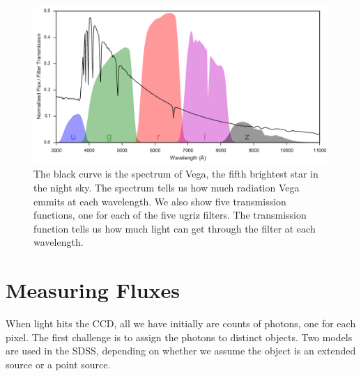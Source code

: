\begin{figure}[tbp]
	\centering
	\includegraphics[width=\textwidth]{figures/2_astro/vega_filters_and_spectrum}
	\caption[Spectrum of the star Vega and the ugriz bandpasses]{The black curve
		is the spectrum of Vega, the fifth brightest star in the night sky. The spectrum
		tells us how much radiation Vega emmits at each wavelength. We also show five
		transmission functions, one for each of the five ugriz filters. The transmission
		function tells us how much light can get through the filter at each wavelength.}
	\label{fig:vega} 
\end{figure}


\section{Measuring Fluxes}
\label{sec:mag}
When light hits the CCD, all we have initially are counts of photons, one for each pixel.
The first challenge is to assign the photons to distinct objects. Two models are used
in the SDSS, depending on whether we assume the object is an extended source or a point source.


